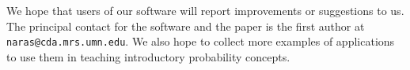 We hope that users of our software will report improvements or
suggestions to us.  The principal contact for the software and the
paper is the first author at {\tt naras@cda.mrs.umn.edu}.  
We also hope to collect more examples of applications to use them in
teaching introductory probability concepts.  
